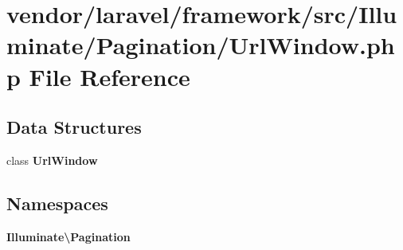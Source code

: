 \section{vendor/laravel/framework/src/\+Illuminate/\+Pagination/\+Url\+Window.php File Reference}
\label{_url_window_8php}
\subsection*{Data Structures}
\begin{DoxyCompactItemize}
\item 
class {\bf Url\+Window}
\end{DoxyCompactItemize}
\subsection*{Namespaces}
\begin{DoxyCompactItemize}
\item 
 {\bf Illuminate\textbackslash{}\+Pagination}
\end{DoxyCompactItemize}
